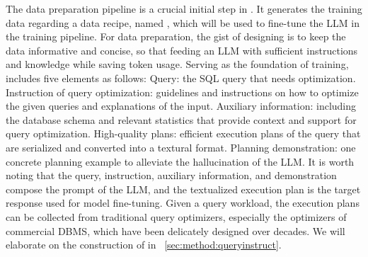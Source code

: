 The data preparation pipeline is a crucial initial step in \LLMQO. It generates the training data regarding a data recipe, named \QueryInstruct, which will be used to fine-tune the LLM in the training pipeline.
For data preparation, the gist of designing \QueryInstruct is to keep the data informative and concise, so that feeding an LLM with sufficient instructions and knowledge while saving token usage.
Serving as the foundation of \LLMQO training, \QueryInstruct includes five elements as follows:  Query: the SQL query that needs optimization. 
 Instruction of query optimization: guidelines and instructions on how to optimize the given queries and explanations of the input.
 Auxiliary information: including the database schema and relevant statistics that provide context and support for query optimization.
 High-quality plans: efficient execution plans of the query that are serialized and converted into a textural format. 
 Planning demonstration: one concrete planning example to alleviate the hallucination of the LLM.
It is worth noting that the query, instruction, auxiliary information, and demonstration compose the prompt of the LLM, and the textualized execution plan is the target response used for model fine-tuning. 
Given a query workload, the execution plans can be collected from traditional query optimizers, especially the optimizers of commercial DBMS, which have been delicately designed over decades. 
We will elaborate on the construction of \QueryInstruct in ~\cref{sec:method:queryinstruct}. 

